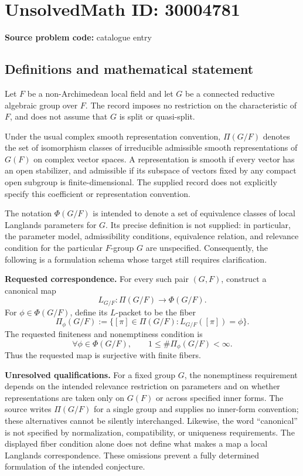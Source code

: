 \documentclass[11pt]{article}
\begin{document}
\section*{UnsolvedMath ID: 30004781}
\textbf{Source problem code:} catalogue entry
\subsection{Definitions and mathematical statement}
Let \(F\) be a non-Archimedean local field and let \(G\) be a connected reductive algebraic group over \(F\). The record imposes no restriction on the characteristic of \(F\), and does not assume that \(G\) is split or quasi-split.

Under the usual complex smooth representation convention, \(\Pi(G/F)\) denotes the set of isomorphism classes of irreducible admissible smooth representations of \(G(F)\) on complex vector spaces. A representation is smooth if every vector has an open stabilizer, and admissible if its subspace of vectors fixed by any compact open subgroup is finite-dimensional. The supplied record does not explicitly specify this coefficient or representation convention.

The notation \(\Phi(G/F)\) is intended to denote a set of equivalence classes of local Langlands parameters for \(G\). Its precise definition is not supplied: in particular, the parameter model, admissibility conditions, equivalence relation, and relevance condition for the particular \(F\)-group \(G\) are unspecified. Consequently, the following is a formulation schema whose target still requires clarification.

\textbf{Requested correspondence.} For every such pair \((G,F)\), construct a canonical map
\[
L_{G/F}\colon \Pi(G/F)\longrightarrow\Phi(G/F).
\]
For \(\phi\in\Phi(G/F)\), define its \(L\)-packet to be the fiber
\[
\Pi_\phi(G/F)
:=\{[\pi]\in\Pi(G/F):L_{G/F}([\pi])=\phi\}.
\]
The requested finiteness and nonemptiness condition is
\[
\forall\phi\in\Phi(G/F),\qquad
1\leq\#\Pi_\phi(G/F)<\infty.
\]
Thus the requested map is surjective with finite fibers.

\textbf{Unresolved qualifications.} For a fixed group \(G\), the nonemptiness requirement depends on the intended relevance restriction on parameters and on whether representations are taken only on \(G(F)\) or across specified inner forms. The source writes \(\Pi(G/F)\) for a single group and supplies no inner-form convention; these alternatives cannot be silently interchanged. Likewise, the word ``canonical'' is not specified by normalization, compatibility, or uniqueness requirements. The displayed fiber condition alone does not define what makes a map a local Langlands correspondence. These omissions prevent a fully determined formulation of the intended conjecture.
\end{document}
